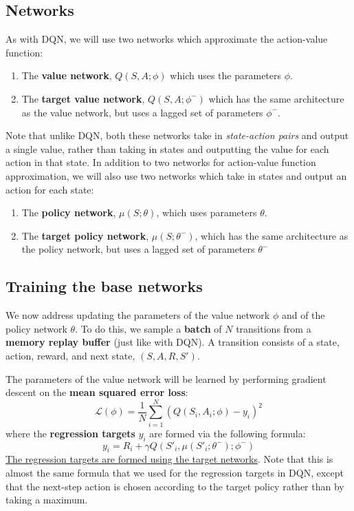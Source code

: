 \documentclass[]{article}
\begin{document}
\subsection*{Networks}
As with DQN, we will use two networks which approximate the action-value function:
\begin{enumerate}
	\item The \textbf{value network}, $Q(S,A;\phi)$ which uses the parameters $\phi$.
	\item The \textbf{target value network}, $Q(S,A;\phi^-)$ which has the same architecture as the value network, but uses a lagged set of parameters $\phi^-$.
\end{enumerate}
Note that unlike DQN, both these networks take in \emph{state-action pairs} and output a single value, rather than taking in states and outputting the value for each action in that state. In addition to two networks for action-value function approximation, we will also use two networks which take in states and output an action for each state:
\begin{enumerate}
	\item The \textbf{policy network}, $\mu(S;\theta)$, which uses parameters $\theta$.
	\item The \textbf{target policy network}, $\mu(S;\theta^-)$, which has the same architecture as the policy network, but uses a lagged set of parameters $\theta^-$
\end{enumerate}

\subsection*{Training the base networks}

We now address updating the parameters of the value network $\phi$ and of the policy network $\theta$. To do this, we sample a \textbf{batch} of $N$ transitions from a \textbf{memory replay buffer} (just like with DQN). A transition consists of a state, action, reward, and next state, $(S, A, R, S')$. 

The parameters of the value network will be learned by performing gradient descent on the \textbf{mean squared error loss}:
\begin{equation}\label{eq:loss function for value network}
	\mathcal{L}(\phi) = \frac{1}{N} \sum_{i=1}^N \left( Q(S_i,A_i;\phi) - y_i \right)^2 
\end{equation}
where the \textbf{regression targets} $y_i$ are formed via the following formula:
\begin{equation}\label{eq:regression targets DDPG}
	y_i = R_i + \gamma Q(S'_i,\mu(S'_i;\theta^-);\phi^-)
\end{equation}
\underline{The regression targets are formed using the target networks}. Note that this is almost the same formula that we used for the regression targets in DQN, except that the next-step action is chosen according to the target policy rather than by taking a maximum. 
\end{document}
